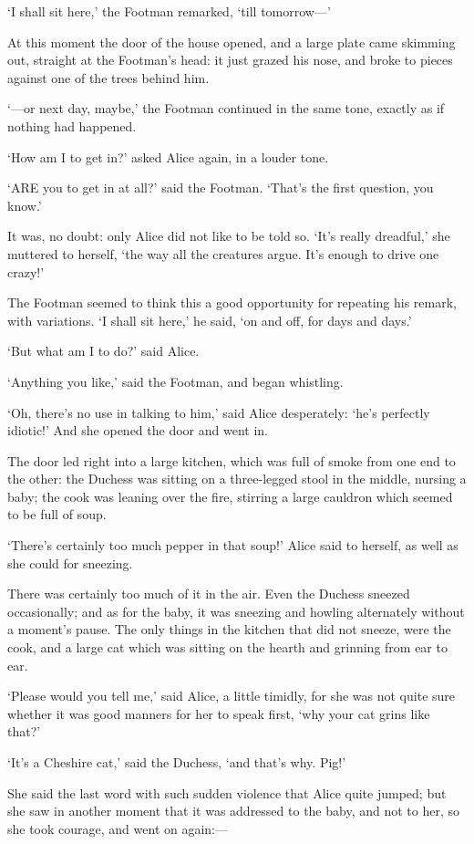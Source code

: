 \documentclass[12pt]{article}
\begin{document}
\begin{Parallel}[p]{}{}
{‘I shall sit here,’ the Footman remarked, ‘till tomorrow—’

At this moment the door of the house opened, and a large plate came skimming out, straight at the Footman’s head: it just grazed his nose, and broke to pieces against one of the trees behind him.

‘—or next day, maybe,’ the Footman continued in the same tone, exactly as if nothing had happened.

‘How am I to get in?’ asked Alice again, in a louder tone.

‘ARE you to get in at all?’ said the Footman. ‘That’s the first question, you know.’

It was, no doubt: only Alice did not like to be told so. ‘It’s really dreadful,’ she muttered to herself, ‘the way all the creatures argue. It’s enough to drive one crazy!’

The Footman seemed to think this a good opportunity for repeating his remark, with variations. ‘I shall sit here,’ he said, ‘on and off, for days and days.’

‘But what am I to do?’ said Alice.

‘Anything you like,’ said the Footman, and began whistling.

‘Oh, there’s no use in talking to him,’ said Alice desperately: ‘he’s perfectly idiotic!’ And she opened the door and went in.

The door led right into a large kitchen, which was full of smoke from one end to the other: the Duchess was sitting on a three-legged stool in the middle, nursing a baby; the cook was leaning over the fire, stirring a large cauldron which seemed to be full of soup.

‘There’s certainly too much pepper in that soup!’ Alice said to herself, as well as she could for sneezing.

There was certainly too much of it in the air. Even the Duchess sneezed occasionally; and as for the baby, it was sneezing and howling alternately without a moment’s pause. The only things in the kitchen that did not sneeze, were the cook, and a large cat which was sitting on the hearth and grinning from ear to ear.

‘Please would you tell me,’ said Alice, a little timidly, for she was not quite sure whether it was good manners for her to speak first, ‘why your cat grins like that?’

‘It’s a Cheshire cat,’ said the Duchess, ‘and that’s why. Pig!’

She said the last word with such sudden violence that Alice quite jumped; but she saw in another moment that it was addressed to the baby, and not to her, so she took courage, and went on again:—

}
\end{Parallel}
\end{document}
